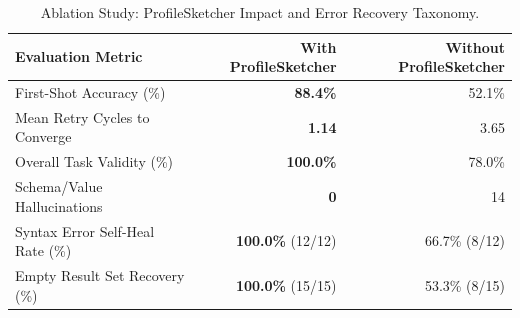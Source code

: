 \begin{table}[t]
\centering
\small
\caption{Ablation Study: ProfileSketcher Impact and Error Recovery Taxonomy.}
\label{tab:ablation_study}
\begin{tabular}{@{}lrr@{}}
\toprule
\textbf{Evaluation Metric} & \textbf{With ProfileSketcher} & \textbf{Without ProfileSketcher} \\ \midrule
First-Shot Accuracy (\%)            & \textbf{88.4\%}              & 52.1\%                           \\
Mean Retry Cycles to Converge       & \textbf{1.14}                & 3.65                             \\
Overall Task Validity (\%)          & \textbf{100.0\%}             & 78.0\%                           \\
Schema/Value Hallucinations         & \textbf{0}                   & 14                               \\
Syntax Error Self-Heal Rate (\%)    & \textbf{100.0\%} (12/12)     & 66.7\% (8/12)                    \\
Empty Result Set Recovery (\%)      & \textbf{100.0\%} (15/15)     & 53.3\% (8/15)                    \\ \bottomrule
\end{tabular}
\end{table}
